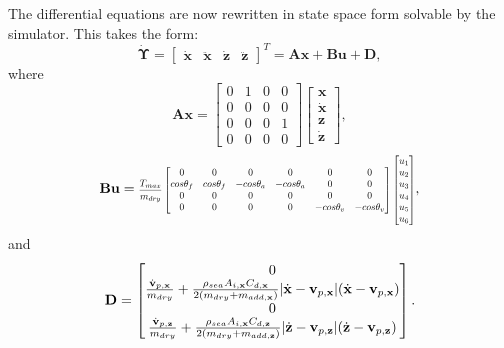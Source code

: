 \documentclass[letterpaper, 10pt, conference]{IEEEtran}
\DeclarePairedDelimiter\abs{\lvert}{\rvert}%
\newcommand\scalemath[2]{\scalebox{#1}{\mbox{\ensuremath{\displaystyle #2}}}}
\renewcommand{\vec}[1]{\mathbf{#1}}
\begin{document}
The differential equations are now rewritten in state space form solvable by the simulator. This takes the form:
\begin{equation}
\dot{\vec{\Upsilon}} = \begin{bmatrix} \dot{\vec{x}} & \ddot{\vec{x}} & \dot{\vec{z}} & \ddot{\vec{z}}\end{bmatrix}^T = \vec{A}\vec{x} + \vec{B}\vec{u} + \vec{D},
\label{eqn5}
\end{equation}
where
\begin{equation}
\vec{A}\vec{x} = \begin{bmatrix} 0 & 1 & 0 & 0 \\ 0 & 0 & 0 & 0 \\ 0 & 0 & 0 & 1 \\ 0 & 0 & 0 & 0  \end{bmatrix} \begin{bmatrix} \vec{x} \\ \dot{\vec{x}} \\ \vec{z} \\ \dot{\vec{z}} \end{bmatrix},
\label{eqn6}
\end{equation}
\begin{equation} 
\vec{B}\vec{u} = \scalemath{0.69}{ \frac{T_{max}}{m_{dry}} \begin{bmatrix} 0 & 0 & 0 & 0 & 0 & 0 \\ cos\theta_f & cos\theta_f & -cos\theta_a & -cos\theta_a & 0 & 0 \\ 0 & 0 & 0 & 0 & 0 & 0 \\ 0 & 0 & 0 & 0 & -cos\theta_v & -cos\theta_v \end{bmatrix} \begin{bmatrix} u_1 \\ u_2 \\ u_3 \\ u_4 \\ u_5 \\ u_6 \end{bmatrix} },
\label{eqn7}
\end{equation}
and
\begin{equation} 
\vec{D} = \begin{bmatrix} 0 \\ \frac{\dot{\vec{v}}_{p,\vec{x}}}{m_{dry}} + \frac{\rho_{sea} A_{i,\vec{x}} C_{d,\vec{x}}}{2(m_{dry}+m_{add,\vec{x}})} \abs{\dot{\vec{x}}-\vec{v}_{p,\vec{x}}} (\dot{\vec{x}}-\vec{v}_{p,\vec{x}})  \\ 0 \\ \frac{\dot{\vec{v}}_{p,\vec{z}}}{m_{dry}} + \frac{\rho_{sea} A_{i,\vec{x}} C_{d,\vec{z}}}{2(m_{dry}+m_{add,\vec{z}})} \abs{\dot{\vec{z}}-\vec{v}_{p,\vec{z}}} (\dot{\vec{z}}-\vec{v}_{p,\vec{z}}) \end{bmatrix}. 
\label{eqn8}
\end{equation}
\end{document}
